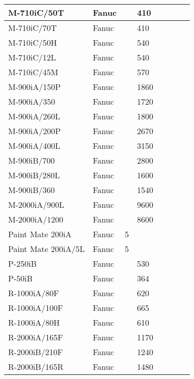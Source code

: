 \begin{longtable}{|p{}|p{}|p{}|p{}|p{}|p{}|p{}|p{}|}
M-710iC/50T & Fanuc &  & \cellcolor{red} 410 &  &  &  &  \\ \hline
M-710iC/70T & Fanuc &  & \cellcolor{red} 410 &  &  &  &  \\ \hline
M-710iC/50H & Fanuc &  & \cellcolor{red} 540 &  &  &  &  \\ \hline
M-710iC/12L & Fanuc &  & \cellcolor{red} 540 &  &  &  &  \\ \hline
M-710iC/45M & Fanuc &  & \cellcolor{red} 570 &  &  &  &  \\ \hline
M-900iA/150P & Fanuc &  & \cellcolor{red} 1860 &  &  &  &  \\ \hline
M-900iA/350 & Fanuc &  & \cellcolor{red} 1720 &  &  &  &  \\ \hline
M-900iA/260L & Fanuc &  & \cellcolor{red} 1800 &  &  &  &  \\ \hline
M-900iA/200P & Fanuc &  & \cellcolor{red} 2670 &  &  &  &  \\ \hline
M-900iA/400L & Fanuc &  & \cellcolor{red} 3150 &  &  &  &  \\ \hline
M-900iB/700 & Fanuc &  & \cellcolor{red} 2800 &  &  &  &  \\ \hline
M-900iB/280L & Fanuc &  & \cellcolor{red} 1600 &  &  &  &  \\ \hline
M-900iB/360 & Fanuc &  & \cellcolor{red} 1540 &  &  &  &  \\ \hline
M-2000iA/900L & Fanuc &  & \cellcolor{red} 9600 &  &  &  &  \\ \hline
M-2000iA/1200 & Fanuc &  & \cellcolor{red} 8600 &  &  &  &  \\ \hline
Paint Mate 200iA & Fanuc & \cellcolor{red} 5 &  &  &  &  &  \\ \hline
Paint Mate 200iA/5L & Fanuc & \cellcolor{red} 5 &  &  &  &  &  \\ \hline
P-250iB & Fanuc &  & \cellcolor{red} 530 &  &  &  &  \\ \hline
P-50iB & Fanuc &  & \cellcolor{red} 364 &  &  &  &  \\ \hline
R-1000iA/80F & Fanuc &  & \cellcolor{red} 620 &  &  &  &  \\ \hline
R-1000iA/100F & Fanuc &  & \cellcolor{red} 665 &  &  &  &  \\ \hline
R-1000iA/80H & Fanuc &  & \cellcolor{red} 610 &  &  &  &  \\ \hline
R-2000iA/165F & Fanuc &  & \cellcolor{red} 1170 &  &  &  &  \\ \hline
R-2000iB/210F & Fanuc &  & \cellcolor{red} 1240 &  &  &  &  \\ \hline
R-2000iB/165R & Fanuc &  & \cellcolor{red} 1480 &  &  &  &  \\ \hline

\end{longtable}
